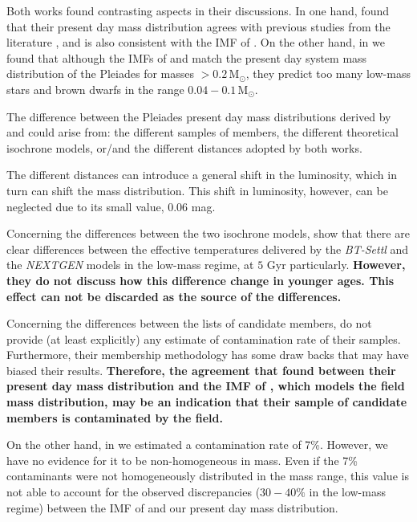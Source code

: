 Both works found contrasting aspects in their discussions. In one hand, \citet{Lodieu2012} found that their present day mass distribution agrees with previous studies from the literature \cite[e.g.][]{2001A&A...367..211M}, and is also consistent with the IMF of \citet{Chabrier2005}.  On the other hand, in \citet{Bouy2015} we found that although the IMFs of \citet{Chabrier2005} and \citet{Thies2007} match the present day system mass distribution of the Pleiades for masses $>0.2\,\mathrm{M_{\odot}}$, they predict too many low-mass stars and brown dwarfs in the range $0.04-0.1\,\mathrm{M_{\odot}}$. 

The difference between the Pleiades present day mass distributions derived by \citet{Lodieu2012} and  \citet{Bouy2015} could arise from: the different samples of members, the different theoretical isochrone models, or/and the different distances adopted by both works. 

The different distances can introduce a general shift in the luminosity, which in turn can shift the mass distribution. This shift in luminosity, however, can be neglected due to its small value, $0.06$ mag.

Concerning the differences between the two isochrone models, \citet{2013MmSAI..84.1053A} show that there are clear differences between the effective temperatures delivered by the \emph{BT-Settl} and the \emph{NEXTGEN} models in the low-mass regime, at $5$ Gyr particularly. \textbf{However, they do not discuss how this difference change in younger ages. This effect can not be discarded as the source of the differences.}

Concerning the differences between the lists of candidate members, \citet{Lodieu2012} do not provide (at least explicitly) any estimate of contamination rate of their samples. Furthermore, their membership methodology has some draw backs \cite[see][]{Sarro2014} that may have biased their results. \textbf{Therefore, the agreement that \citet{Lodieu2012} found between their present day mass distribution and the IMF of \citet{Chabrier2005}, which models the field mass distribution, may be an indication that their sample of candidate members is contaminated by the field.  }

On the other hand, in \citet{Bouy2015} we estimated a contamination rate of 7\%. However, we have no evidence for it to be non-homogeneous in mass. Even if the 7\% contaminants were not homogeneously distributed in the mass range, this value is not able to account for the observed discrepancies ($30-40\%$ in the low-mass regime) between the IMF of \citet{Chabrier2005} and our present day mass distribution.

